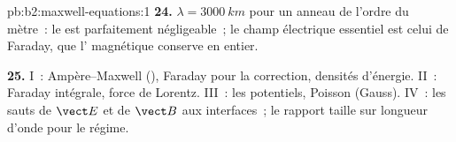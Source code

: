 \begin{solution}{pb:b2:maxwell-equations:1}
\textbf{24.} $\lambda = \qty{3000}{km}$ pour un anneau de l'ordre du mètre~: le  est parfaitement négligeable~; le champ électrique essentiel est
celui de Faraday, que l' magnétique conserve en entier.

\textbf{25.} I~: Ampère--Maxwell (), Faraday pour
la correction, densités d'énergie. II~: Faraday intégrale, force de Lorentz.
III~: les potentiels, Poisson (Gauss). IV~: les sauts de $\vect E$
et de $\vect B$ aux interfaces~; le rapport taille sur longueur d'onde pour le régime.
\end{solution}
